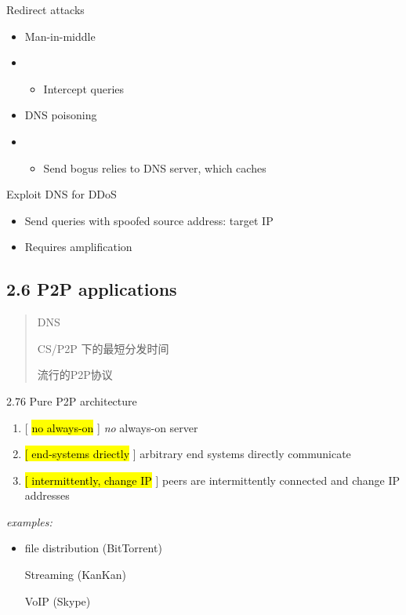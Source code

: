 \documentclass[
]{article}
\begin{document}
Redirect attacks

\begin{itemize}
\item
  Man-in-middle
\item
  \begin{itemize}
  \item
    Intercept queries
  \end{itemize}
\item
  DNS poisoning
\item
  \begin{itemize}
  \item
    Send bogus relies to DNS server, which caches
  \end{itemize}
\end{itemize}

Exploit DNS for DDoS

\begin{itemize}
\item
  Send queries with spoofed source address: target IP
\item
  Requires amplification
\end{itemize}

\hypertarget{26-p2p-applications}{%
\subsection{2.6 P2P applications}\label{26-p2p-applications}}

\begin{quote}
DNS

CS/P2P 下的最短分发时间

流行的P2P协议
\end{quote}

2.76 Pure P2P architecture

\begin{enumerate}
\def\labelenumi{\arabic{enumi}.}
\item
  {[} \hl{no always-on} {]} \emph{no} always-on server
\item
  \hl{{[} end-systems driectly} {]} arbitrary end systems directly
  communicate
\item
  \hl{{[} intermittently, change IP} {]} peers are intermittently
  connected and change IP addresses
\end{enumerate}

\emph{examples:}

\begin{itemize}
\item
  file distribution (BitTorrent)

  Streaming (KanKan)

  VoIP (Skype)
\end{itemize}
\end{document}

